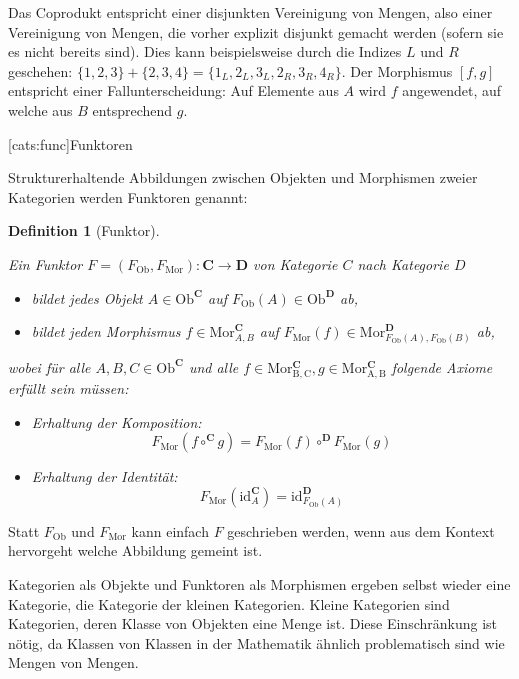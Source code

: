 \documentclass[12pt, a4paper, bibgerm]{scrbook}
\newcommand\lsection{}
\newtheorem{defini}{Definition}
\newcommand{\defi}[2]{%
  \begin{defini}[#1]
    \label{def:#1}
    #2
  \end{defini}
}
\begin{document}
Das Coprodukt entspricht einer disjunkten Vereinigung von Mengen, also
einer Vereinigung von Mengen, die vorher explizit disjunkt gemacht
werden (sofern sie es nicht bereits sind). Dies kann beispielsweise durch
die Indizes $L$ und $R$ geschehen: $\{1,2,3\} + \{2,3,4\} =
\{1_L,2_L,3_L,2_R,3_R,4_R\}$. Der Morphismus $[f,g]$ entspricht einer
Fallunterscheidung: Auf Elemente aus $A$ wird $f$ angewendet, auf welche
aus $B$ entsprechend $g$.

\lsection[cats:func]{Funktoren}

Strukturerhaltende Abbildungen zwischen Objekten und Morphismen zweier
Kategorien werden Funktoren genannt:

\defi{Funktor}{
Ein Funktor $F=(F_{\mathrm{Ob}},F_{\mathrm{Mor}}) : \mathbf{C}
\rightarrow \mathbf{D}$ von Kategorie $C$ nach Kategorie $D$
    \begin{itemize}
    \item bildet jedes Objekt $A \in \mathrm{Ob}^{\mathbf{C}}$ auf $F_{\mathrm{Ob}}(A) \in
      \mathrm{Ob}^{\mathbf{D}}$ ab,
    \item bildet jeden Morphismus $f \in
      \mathrm{Mor}^{\mathbf{C}}_{A,B}$ auf $F_{\mathrm{Mor}}(f) \in
      \mathrm{Mor}^{\mathbf{D}}_{F_{\mathrm{Ob}}(A),F_{\mathrm{Ob}}(B)}$
      ab,
    \end{itemize}
    wobei für alle $A,B,C \in \mathrm{Ob}^{\mathbf{C}}$ und alle $f \in
    \mathrm{Mor^{\mathbf{C}}_{B,C}},g \in
    \mathrm{Mor^{\mathbf{C}}_{A,B}}$ folgende Axiome erfüllt sein
    müssen:
    \begin{itemize}
    \item Erhaltung der Komposition:
      $$F_{\mathrm{Mor}}(f \circ^{\mathbf{C}} g) =
      F_{\mathrm{Mor}}(f) \circ^{\mathbf{D}} F_{\mathrm{Mor}}(g)$$
    \item Erhaltung der Identität:
      $$F_{\mathrm{Mor}}(\mathrm{id}^{\mathbf{C}}_A) =
      \mathrm{id}^{\mathbf{D}}_{F_{\mathrm{Ob}}(A)}$$
    \end{itemize}
}

Statt $F_{\mathrm{Ob}}$ und $F_{\mathrm{Mor}}$ kann einfach $F$
geschrieben werden, wenn aus dem Kontext hervorgeht welche Abbildung
gemeint ist.

Kategorien als Objekte und Funktoren als Morphismen ergeben selbst
wieder eine Kategorie, die Kategorie der kleinen Kategorien. Kleine
Kategorien sind Kategorien, deren Klasse von Objekten eine Menge
ist. Diese Einschränkung ist nötig, da Klassen von Klassen in der
Mathematik ähnlich problematisch sind wie Mengen von Mengen.
\end{document}
